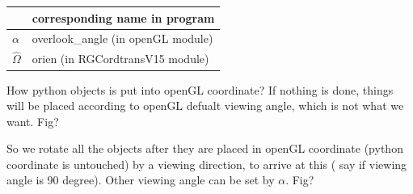 \begin{center}
\begin{tabular}{l|l}
& corresponding name in program \\ \hline
$\alpha $ & overlook\_angle (in openGL module) \\ 
$\hat{\Omega}$ & orien (in RGCordtransV15 module)%
\end{tabular}
\end{center}

\bigskip 

How python objects is put into openGL coordinate? If nothing is done, things
will be placed according to openGL defualt viewing angle, which is not what
we want. Fig?

So we rotate all the objects after they are placed in openGL coordinate
(python coordinate is untouched) by a viewing direction, to arrive at this (
say if viewing angle is 90 degree). Other viewing angle can be set by $%
\alpha $. Fig?

%
